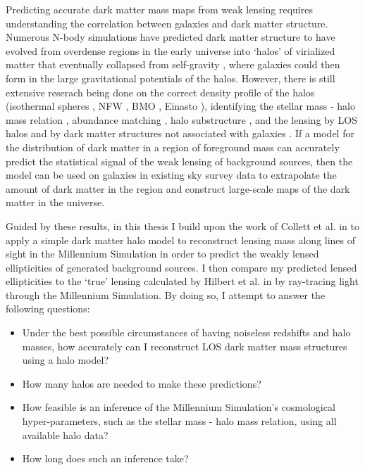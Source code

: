 \documentclass[%
 reprint,
 amsmath,amssymb,
 aps,nofootinbib
]{revtex4-1}
\begin{document}
Predicting accurate dark matter mass maps from weak lensing requires understanding the correlation between galaxies and dark matter structure. Numerous N-body simulations have predicted dark matter structure to have evolved from overdense regions in the early universe into `halos' of virialized matter that eventually collapsed from self-gravity \cite{halo_formation}, where galaxies could then form in the large gravitational potentials of the halos. However, there is still extensive reserach being done on the correct density profile of the halos (isothermal spheres \cite{isothermal_spheres}, NFW \cite{nfw}, BMO \cite{nfw_bmo}, Einasto \cite{einasto}), identifying the stellar mass - halo mass relation \cite{smhr}, abundance matching \cite{abundance_matching}, halo substructure \cite{halo_substructure}, and the lensing by LOS halos \cite{collett} and by dark matter structures not associated with galaxies \cite{mccully}. If a model for the distribution of dark matter in a region of foreground mass can accurately predict the statistical signal of the weak lensing of background sources, then the model can be used on galaxies in existing sky survey data to extrapolate the amount of dark matter in the region and construct large-scale maps of the dark matter in the universe.

Guided by these results, in this thesis I build upon the work of Collett et al. in \cite{collett} to apply a simple dark matter halo model to reconstruct lensing mass along lines of sight in the Millennium Simulation in order to predict the weakly lensed ellipticities of generated background sources. I then compare my predicted lensed ellipticities to the `true' lensing calculated by Hilbert et al. in \cite{ray_tracing} by ray-tracing light through the Millennium Simulation. By doing so, I attempt to answer the following questions: 

\begin{itemize}
\item Under the best possible circumstances of having noiseless redshifts and halo masses, how accurately can I reconstruct LOS dark matter mass structures using a halo model?
\item How many halos are needed to make these predictions?
\item How feasible is an inference of the Millennium Simulation's cosmological hyper-parameters, such as the stellar mass - halo mass relation, using all available halo data? 
\item How long does such an inference take?
\end{itemize}
\end{document}
